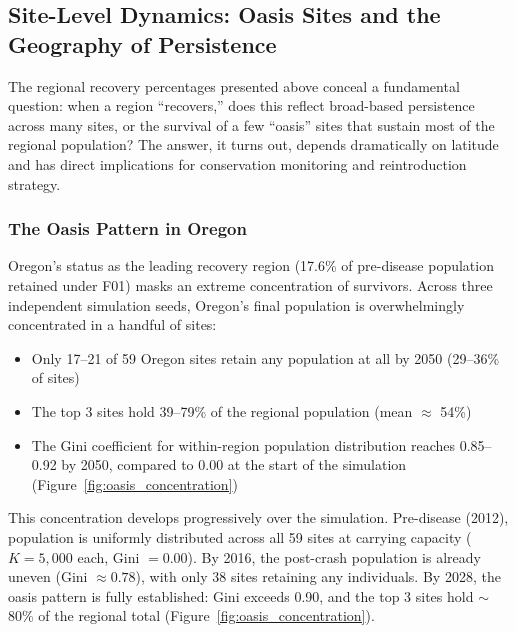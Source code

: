 
\subsection{Site-Level Dynamics: Oasis Sites and the Geography of Persistence}
\label{sec:oasis}

The regional recovery percentages presented above conceal a fundamental question:
when a region ``recovers,'' does this reflect broad-based persistence across
many sites, or the survival of a few ``oasis'' sites that sustain most of the
regional population?  The answer, it turns out, depends dramatically on latitude
and has direct implications for conservation monitoring and reintroduction strategy.

\subsubsection{The Oasis Pattern in Oregon}

Oregon's status as the leading recovery region (17.6\% of pre-disease population
retained under F01) masks an extreme concentration of survivors.  Across three
independent simulation seeds, Oregon's final population is overwhelmingly
concentrated in a handful of sites:

\begin{itemize}
  \item Only 17--21 of 59 Oregon sites retain any population at all by 2050
    (29--36\% of sites)
  \item The top 3 sites hold 39--79\% of the regional population (mean $\approx$ 54\%)
  \item The Gini coefficient for within-region population distribution reaches
    0.85--0.92 by 2050, compared to 0.00 at the start of the simulation
    (Figure~\ref{fig:oasis_concentration})
\end{itemize}

\noindent
This concentration develops progressively over the simulation.  Pre-disease
(2012), population is uniformly distributed across all 59 sites at carrying
capacity ($K = 5{,}000$ each, Gini $= 0.00$).  By 2016, the post-crash population
is already uneven (Gini $\approx 0.78$), with only 38 sites retaining any
individuals.  By 2028, the oasis pattern is fully established: Gini exceeds
0.90, and the top 3 sites hold $\sim$80\% of the regional total
(Figure~\ref{fig:oasis_concentration}).

